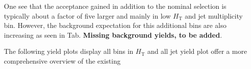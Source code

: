 One see that the acceptance gained in addition to the nominal selection is typically about a factor of five larger and mainly in low $H_\textrm{T}$ and jet multiplicity bin.
However, the background expectation for this additional bins are also increasing as seen in Tab. {\bf Missing background yields, to be added}.

The following yield plots display all bins in $H_\textrm{T}$ and all jet yield plot offer a more comprehensive overview of the existing 

\begin{figure}[]
  \centering
  ~~
  \\
\end{figure}
